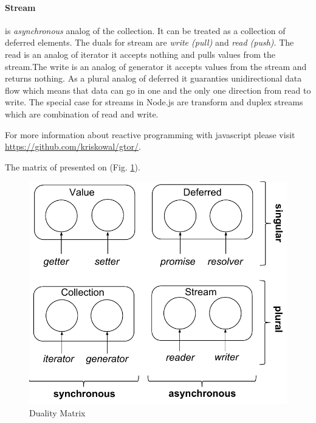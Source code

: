 \paragraph{Stream} is \textit{asynchronous} analog of the collection. It can be treated as a collection of deferred elements. The duals for stream are \textit{write (pull)} and \textit{read (push)}. The read is an analog of iterator it accepts nothing and pulls values from the stream.The write is an analog of generator it accepts values from the stream and returns nothing. As a plural analog of deferred it guaranties unidirectional data flow which means that data can go in one and the only one direction from read to write. 
The special case for streams in Node.js are transform and duplex streams which are combination of read and write.

For more information about reactive programming with javascript please visit \url{https://github.com/kriskowal/gtor/}.


The matrix of presented on (Fig. \ref{fig:dualityMatrix}).

\begin{figure}[ht]
  	\label{fig:dualityMatrix}
    \centering
    \includegraphics[scale = 0.5]{grafiken/dualityMatrix}
     \caption{Duality Matrix \cite{gtor}}
  \end{figure}
  


